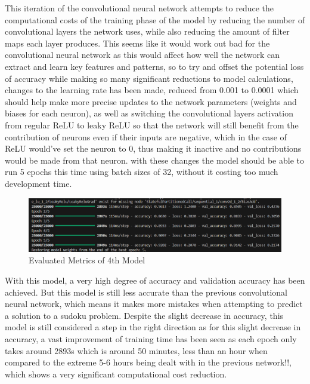 \documentclass[]{final_report}
\begin{document}
This iteration of the convolutional neural network attempts to reduce the computational costs of the training phase of the model by reducing the number of convolutional layers the network uses, while also reducing the amount of filter maps each layer produces. This seems like it would work out bad for the convolutional neural network as this would affect how well the network can extract and learn key features and patterns, so to try and offset the potential loss of accuracy while making so many significant reductions to model calculations, changes to the learning rate has been made, reduced from 0.001 to 0.0001 which should help make more precise updates to the network parameters (weights and biases for each neuron), as well as switching the convolutional layers activation from regular ReLU to leaky ReLU so that the network will still benefit from the contribution of neurons even if their inputs are negative, which in the case of ReLU would've set the neuron to 0, thus making it inactive and no contributions would be made from that neuron. with these changes the model should be able to run 5 epochs this time using batch sizes of 32, without it costing too much development time.

\begin{figure}[ht]
    \centering 
    \begin{minipage}{1.1\textwidth} 
        \includegraphics[width=\textwidth]{images/4th model metrics.png} 
        \caption{Evaluated Metrics of 4th Model}
        \label{fig: Evaluated Metrics of 4th Model} 
    \end{minipage} 
    \hfill 
\end{figure}

With this model, a very high degree of accuracy and validation accuracy has been achieved. But this model is still less accurate than the previous convolutional neural network, which means it makes more mistakes when attempting to predict a solution to a sudoku problem. Despite the slight decrease in accuracy, this model is still considered a step in the right direction as for this slight decrease in accuracy, a vast improvement of training time has been seen as each epoch only takes around 2893s which is around 50 minutes, less than an hour when compared to the extreme 5-6  hours being dealt with in the previous network!!, which shows a very significant computational cost reduction.
\end{document}
